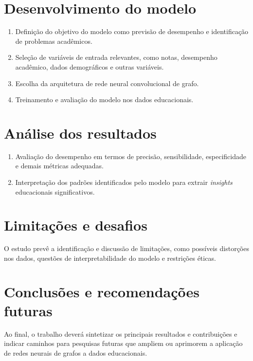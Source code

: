 \section{Desenvolvimento do modelo}

\begin{enumerate}
    \item Defini\c{c}\~ao do objetivo do modelo como previs\~ao de desempenho e identifica\c{c}\~ao de problemas acad\^emicos.
    \item Sele\c{c}\~ao de vari\'aveis de entrada relevantes, como notas, desempenho acad\^emico, dados demogr\'aficos e outras vari\'aveis.
    \item Escolha da arquitetura de rede neural convolucional de grafo.
    \item Treinamento e avalia\c{c}\~ao do modelo nos dados educacionais.
\end{enumerate}

\section{An\'alise dos resultados}

\begin{enumerate}
    \item Avalia\c{c}\~ao do desempenho em termos de precis\~ao, sensibilidade, especificidade e demais m\'etricas adequadas.
    \item Interpreta\c{c}\~ao dos padr\~oes identificados pelo modelo para extrair \textit{insights} educacionais significativos.
\end{enumerate}

\section{Limita\c{c}\~oes e desafios}

O estudo prev\^e a identifica\c{c}\~ao e discuss\~ao de limita\c{c}\~oes, como poss\'iveis distor\c{c}\~oes nos dados, quest\~oes de interpretabilidade do modelo e restri\c{c}\~oes \'eticas.

\section{Conclus\~oes e recomenda\c{c}\~oes futuras}

Ao final, o trabalho dever\'a sintetizar os principais resultados e contribui\c{c}\~oes e indicar caminhos para pesquisas futuras que ampliem ou aprimorem a aplica\c{c}\~ao de redes neurais de grafos a dados educacionais.

